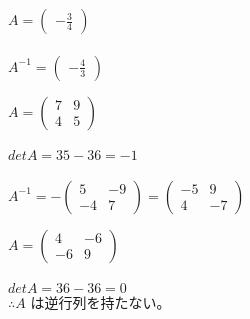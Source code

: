 \documentclass[fleqn]{jsarticle}
\begin{document}
    \begin{description}
		\setlength{\itemsep}{0.5cm}
        \begin{spacing}{1.2}

            \item[(1)]
                $ A =
                \left(
                    \begin{array}{c}
                        -\frac{3}{4}
                    \end{array}
                \right) $ \\\\
                $ A^{-1} =
                \left(
                    \begin{array}{c}
                        -\frac{4}{3}
                    \end{array}
                \right) $

            \item[(2)]
                $ A =
                \left(
                    \begin{array}{cc}
                        7 & 9 \\
                        4 & 5
                    \end{array}
                \right) $ \\\\
                $ detA = 35 - 36 = -1 $ \\\\
                $ A^{-1} =
                -\left(
                    \begin{array}{cc}
                        5 & -9 \\
                        -4 & 7
                    \end{array}
                \right)
                =
                \left(
                    \begin{array}{cc}
                        -5 & 9 \\
                        4 & -7
                    \end{array}
                \right) $

            \item[(3)]
                $ A =
                \left(
                    \begin{array}{cc}
                        4 & -6 \\
                        -6 & 9
                    \end{array}
                \right) $ \\\\
                $ detA = 36 - 36 = 0 $ \\
                $ \therefore A $ は逆行列を持たない。


\end{spacing}
\end{description}
\end{document}
